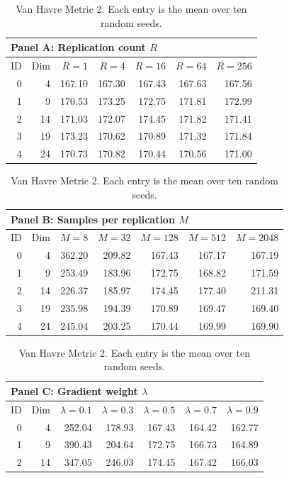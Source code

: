 \begin{table}[htbp]
\centering
\small
\setlength{\tabcolsep}{6pt}
\renewcommand{\arraystretch}{1.08}
\caption{Van Havre Metric 2. Each entry is the mean over ten random seeds.}
\label{tab:van_havre_all_parameters_metric2}
\begin{tabular}{rrrrrrr}
\toprule
\multicolumn{7}{l}{\textbf{Panel A: Replication count $R$}} \\
\midrule
ID & Dim & $R=1$ & $R=4$ & $R=16$ & $R=64$ & $R=256$ \\
\midrule
0 & 4 & 167.10 & 167.30 & 167.43 & 167.63 & 167.56 \\
1 & 9 & 170.53 & 173.25 & 172.75 & 171.81 & 172.99 \\
2 & 14 & 171.03 & 172.07 & 174.45 & 171.82 & 171.41 \\
3 & 19 & 173.23 & 170.62 & 170.89 & 171.32 & 171.84 \\
4 & 24 & 170.73 & 170.82 & 170.44 & 170.56 & 171.00 \\
\bottomrule
\end{tabular}
\par\medskip
\begin{tabular}{rrrrrrr}
\toprule
\multicolumn{7}{l}{\textbf{Panel B: Samples per replication $M$}} \\
\midrule
ID & Dim & $M=8$ & $M=32$ & $M=128$ & $M=512$ & $M=2048$ \\
\midrule
0 & 4 & 362.20 & 209.82 & 167.43 & 167.17 & 167.19 \\
1 & 9 & 253.49 & 183.96 & 172.75 & 168.82 & 171.59 \\
2 & 14 & 226.37 & 185.97 & 174.45 & 177.40 & 211.31 \\
3 & 19 & 235.98 & 194.39 & 170.89 & 169.47 & 169.40 \\
4 & 24 & 245.04 & 203.25 & 170.44 & 169.99 & 169.90 \\
\bottomrule
\end{tabular}
\par\medskip
\begin{tabular}{rrrrrrr}
\toprule
\multicolumn{7}{l}{\textbf{Panel C: Gradient weight $\lambda$}} \\
\midrule
ID & Dim & $\lambda=0.1$ & $\lambda=0.3$ & $\lambda=0.5$ & $\lambda=0.7$ & $\lambda=0.9$ \\
\midrule
0 & 4 & 252.04 & 178.93 & 167.43 & 164.42 & 162.77 \\
1 & 9 & 390.43 & 204.64 & 172.75 & 166.73 & 164.89 \\
2 & 14 & 347.05 & 246.03 & 174.45 & 167.42 & 166.03 \\

\end{tabular}
\end{table}
